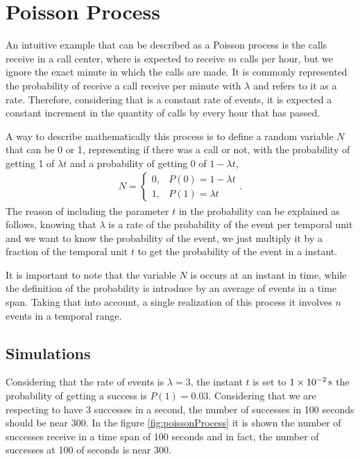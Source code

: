 \documentclass[main.tex]{subfiles}
\begin{document}
\section{Poisson Process}

An intuitive example that can be described as a Poisson process is the calls receive in a call center, where is expected to receive $m$ calls per hour, but we ignore the exact minute in which the calls are made.
It is commonly represented the probability of receive a call receive per minute with $\lambda$ and refers to it as a rate.
Therefore, considering that is a constant rate of events, it is expected a constant increment in the quantity of calls by every hour that has passed.

A way to describe mathematically this process is to define a random variable $N$ that can be \num{0} or \num{1}, representing if there was a call or not, with the probability of getting \num{1} of $\lambda t$ and a probability of getting \num{0} of $1-\lambda t$,
\begin{gather}
    N = \left\{
        \begin{array}{ll}
            0, & P(0) = 1-\lambda t \\
            1, & P(1) = \lambda t
        \end{array}
    \right.
    .\label{eqn5:poissonProcess}
\end{gather}
The reason of including the parameter $t$ in the probability can be explained as follows, knowing that $\lambda$ is a rate of the probability of the event per temporal unit and we want to know the probability of the event, we just multiply it by a fraction of the temporal unit $t$ to get the probability of the event in a instant.

It is important to note that the variable $N$ is occurs at an instant in time, while the definition of the probability is introduce by an average of events in a time span.
Taking that into account, a single realization of this process it involves $n$ events in a temporal range.

\subsection{Simulations}

Considering that the rate of events is $\lambda = 3$, the instant $t$ is set to $\SI{1d-2}{\second}$ the probability of getting a success is $P(1) = 0.03$.
Considering that we are respecting to have 3 successes in a second, the number of successes in 100 seconds should be near 300.
In the figure \ref{fig:poissonProcess} it is shown the number of successes receive in a time span of 100 seconds and in fact, the number of successes at 100 of seconds is near 300.
\end{document}

